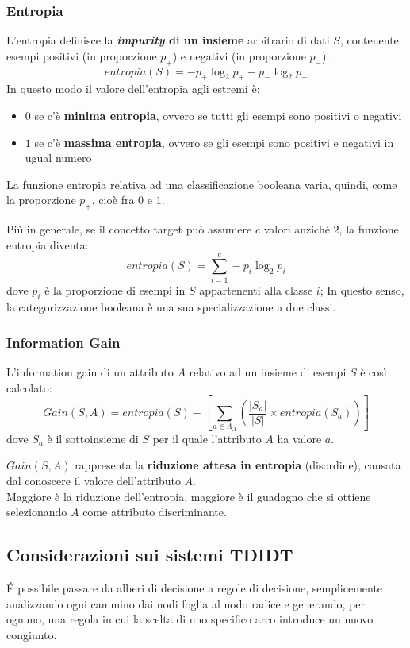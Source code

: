 \documentclass[preprint]{acm_proc_article-sp}
\begin{document}
\subsubsection{Entropia}
\label{entropia}
L'entropia definisce la \textbf{\textit{impurity} di un insieme} arbitrario di dati $S$, contenente esempi positivi (in proporzione $p_+$) e negativi (in proporzione $p_-$):
\[ entropia(S) = -p_+ \log_2p_+ - p_- \log_2p_- \]
In questo modo il valore dell'entropia agli estremi è:
\begin{itemize}
\item $0$ se c'è \textbf{minima entropia}, ovvero se tutti gli esempi sono positivi o negativi
\item $1$ se c'è \textbf{massima entropia}, ovvero se gli esempi sono positivi e negativi in ugual numero
\end{itemize}
La funzione entropia relativa ad una classificazione booleana varia, quindi, come la proporzione $p_+$, cioè fra $0$ e $1$.

Più in generale, se il concetto target può assumere $c$ valori anziché $2$, la funzione entropia diventa:
\[ entropia(S) = \sum_{i=1}^c -p_i \log_2p_i \]
dove $p_i$ è la proporzione di esempi in $S$ appartenenti alla classe $i$; In questo senso, la categorizzazione booleana è una sua specializzazione a due classi.

\subsubsection{Information Gain}
\label{information-gain}
L'information gain di un attributo $A$ relativo ad un insieme di esempi $S$ è così calcolato:
\[Gain(S,A) = entropia(S) - \left[ \sum_{a \in \Lambda_A} \left( \frac{|S_a|}{|S|} \times entropia(S_a) \right) \right] \]
dove $S_a$ è il sottoinsieme di $S$ per il quale l'attributo $A$ ha valore $a$.

$Gain(S,A)$ rappresenta la \textbf{riduzione attesa in entropia} (disordine), causata dal conoscere il valore dell'attributo $A$.\\
Maggiore è la riduzione dell'entropia, maggiore è il guadagno che si ottiene selezionando $A$ come attributo discriminante.

\subsection{Considerazioni sui sistemi TDIDT}
\'E possibile passare da alberi di decisione a regole di decisione, semplicemente analizzando ogni cammino dai nodi foglia al nodo radice e generando, per ognuno, una regola in cui la scelta di uno specifico arco introduce un nuovo congiunto.
\end{document}
